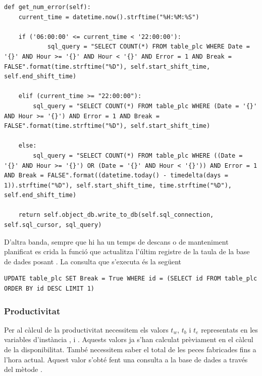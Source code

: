 \documentclass{tfgitic}[2022/06/30]
\begin{document}
\begin{lstlisting}[style=Python]
def get_num_error(self):
    current_time = datetime.now().strftime("%H:%M:%S")
    
    if ('06:00:00' <= current_time < '22:00:00'):
            sql_query = "SELECT COUNT(*) FROM table_plc WHERE Date = '{}' AND Hour >= '{}' AND Hour < '{}' AND Error = 1 AND Break = FALSE".format(time.strftime("%D"), self.start_shift_time, self.end_shift_time)

    elif (current_time >= "22:00:00"):
        sql_query = "SELECT COUNT(*) FROM table_plc WHERE (Date = '{}' AND Hour >= '{}') AND Error = 1 AND Break = FALSE".format(time.strftime("%D"), self.start_shift_time)

    else:
        sql_query = "SELECT COUNT(*) FROM table_plc WHERE ((Date = '{}' AND Hour >= '{}') OR (Date = '{}' AND Hour < '{}')) AND Error = 1 AND Break = FALSE".format((datetime.today() - timedelta(days = 1)).strftime("%D"), self.start_shift_time, time.strftime("%D"), self.end_shift_time)

    return self.object_db.write_to_db(self.sql_connection, self.sql_cursor, sql_query)
\end{lstlisting}

D'altra banda, sempre que hi ha un temps de descans o de manteniment planificat es crida la funció  que actualitza l'últim registre de la taula  de la base de dades posant . La consulta que s'executa és la següent

\begin{lstlisting}[style=sql]
UPDATE table_plc SET Break = True WHERE id = (SELECT id FROM table_plc ORDER BY id DESC LIMIT 1)
\end{lstlisting}

\subsubsection{Productivitat}
\label{subsection:oeeProd}
Per al càlcul de la productivitat necessitem els valors $t_{w}$, $t_{b}$ i $t_{e}$ representats en les variables d'instància ,  i . Aquests valors ja s'han calculat prèviament en el càlcul de la disponibilitat. També necessitem saber el total de les peces fabricades fins a l'hora actual. Aquest valor s'obté fent una consulta a la base de dades a través del mètode .
\end{document}
